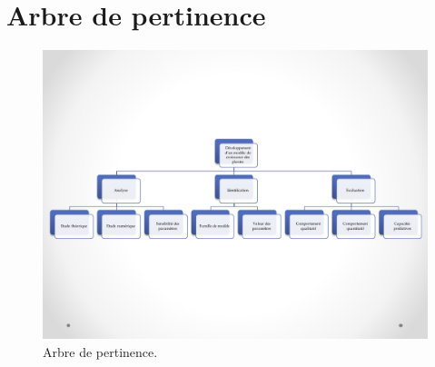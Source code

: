 \section{Arbre de pertinence}
\label{ann:arbre_perti}
\begin{figure}[H]
  \begin{center}
    \includegraphics[scale=0.81,angle=90]{./annexes/arbre_de_pertinence.pdf}
    \caption{Arbre de pertinence.}
    \label{fig:arbre_perti}
  \end{center}
\end{figure}